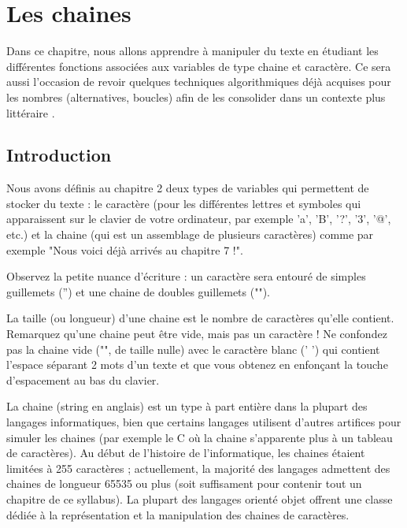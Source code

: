 \chapter{Les chaines}

	Dans ce chapitre, 
	nous allons apprendre à manipuler du texte 
	en étudiant les différentes fonctions associées 
	aux variables de type chaine et caractère. 
	Ce sera aussi l'occasion de revoir quelques techniques algorithmiques 
	déjà acquises pour les nombres (alternatives, boucles) 
	afin de les consolider dans un contexte plus \og littéraire \fg.
	
\section{Introduction}

	Nous avons définis au chapitre 2 deux types de variables 
	qui permettent de stocker du texte : 
	le caractère 
	(pour les différentes lettres et symboles 
	qui apparaissent sur le clavier de votre ordinateur, 
	par exemple 'a', 'B', '?', '3', '@', etc.) 
	et la chaine (qui est un assemblage de plusieurs caractères) 
	comme par exemple "Nous voici déjà arrivés au chapitre 7 !".

	Observez la petite nuance d'écriture :
	un caractère sera entouré de simples guillemets ('') 
	et une chaine de doubles guillemets ("").

	La taille (ou longueur) d'une chaine 
	est le nombre de caractères qu'elle contient. 
	Remarquez qu'une chaine peut être vide, mais pas un caractère !
	Ne confondez pas la chaine vide ("", de taille nulle) 
	avec le caractère blanc (' ') qui contient l'espace séparant 
	2 mots d'un texte et que vous obtenez en enfonçant 
	la touche d'espacement au bas du clavier.

	La chaine (string en anglais) 
	est un type à part entière dans la plupart des langages informatiques, 
	bien que certains langages utilisent d'autres artifices 
	pour simuler les chaines 
	(par exemple le C où la chaine s'apparente plus 
	à un tableau de caractères). 
	Au début de l'histoire de l'informatique, 
	les chaines étaient limitées à 255 caractères ;
	actuellement, la majorité des langages admettent des chaines 
	de longueur 65535 ou plus 
	(soit suffisament pour contenir tout un chapitre de ce syllabus). 
	La plupart des langages orienté objet offrent une classe 
	dédiée à la représentation et la manipulation des chaines de caractères.

